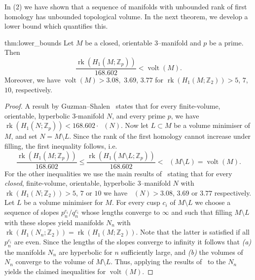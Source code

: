\documentclass[a4paper]{gtart}
\theoremstyle{definition}
\theoremstyle{remark}
\numberwithin{equation}{section}
\newcommand{\Z}{\mathbb{Z}}
\DeclareMathOperator{\volt}{volt}
\DeclareMathOperator{\volh}{vol_{\mathbb{H}}}
\begin{document}
In  (2) we have shown that a sequence of manifolds with unbounded rank of first homology has unbounded topological volume. In the next theorem, we develop a lower bound which quantifies this.

\begin{reptheorem}{thm:lower_bounds}
    Let $M$ be a closed, orientable 3--manifold and $p$ be a prime. Then
    \begin{equation*}
        \frac{\operatorname{rk}(H_1(M;\Z_p))}{168.602}< \volt(M).
    \end{equation*}
    Moreover, we have $\volt(M)>3.08,$ $3.69$, $3.77$ for $\operatorname{rk}(H_1(M;\Z_2))>5$, $7$, $10$, respectively.
\end{reptheorem}

\begin{proof}
   A result by Guzman--Shalen~\cite{Guzman_Shalen} states that for every finite-volume, orientable, hyperbolic 3-manifold $N$, and every prime $p$, we have $\operatorname{rk}(H_1(N;\Z_p)) < 168.602 \cdot  \volh(N)$. Now let $L \subset M$ be a volume minimiser of $M$, and set $N=M\setminus L$. Since the rank of the first homology cannot increase under filling, the first inequality follows, i.e.
   \begin{equation*}
       \frac{\operatorname{rk}(H_1(M;\Z_p))}{168.602}\leq\frac{\operatorname{rk}(H_1(M\setminus L;\Z_p))}{168.602}< \volh(M\setminus L)= \volt(M).
   \end{equation*}
   For the other inequalities we use the main results of~\cite{Culler_Shalen2011,Culler_Shalen2012,Guzman_Shalen2020} stating that for every \textit{closed}, finite-volume, orientable, hyperbolic $3$--manifold $N$ with $\operatorname{rk}(H_1(N;\Z_2))>5$, $7$ or $10$ we have $\volh(N)>3.08$, $3.69$ or $3.77$ respectively. Let $L$ be a volume minimiser for $M$. For every cusp $c_i$ of $M\setminus L$ we choose a sequence of slopes $p^{c_i}_n/q^{c_i}_n$ whose lengths converge to $\infty$ and such that filling $M\setminus L$ with these slopes yield manifolds $N_n$ with $\operatorname{rk}(H_1(N_n;\Z_2))=\operatorname{rk}(H_1(M;\Z_2))$. Note that the latter is satisfied if all $p^{c_i}_n$ are even. Since the lengths of the slopes converge to infinity it follows that {\em (a)} the manifolds $N_n$ are hyperbolic for $n$ sufficiently large, and {\em (b)} the volumes of $N_n$ converge to the volume of $M\setminus L$. Thus, applying the results of~\cite{Culler_Shalen2011,Culler_Shalen2012,Guzman_Shalen2020} to the $N_n$ yields the claimed inequalities for $\volt(M)$.
\end{proof}
\end{document}
